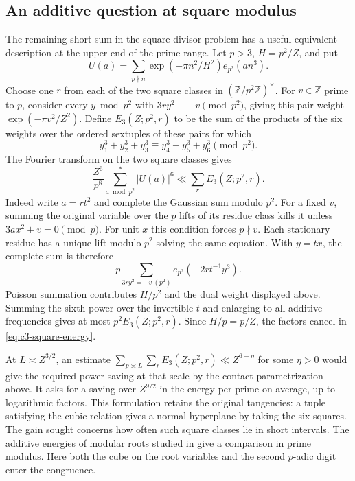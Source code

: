 \documentclass[11pt,letterpaper]{article}
\theoremstyle{definition}
\begin{document}
\subsection{An additive question at square modulus}
\label{c3:dual-energy}
The remaining short sum in the square-divisor problem has a useful
equivalent description at the upper end of the prime range. Let
$p>3$, $H=p^2/Z$, and put
\[
 U(a)=\sum_{p\nmid n}\exp(-\pi n^2/H^2)e_{p^2}(a n^3).
\]
Choose one $r$ from each of the two square classes in
$(\mathbb Z/p^2\mathbb Z)^\times$. For $v\in\mathbb Z$ prime to $p$,
consider every $y\bmod p^2$ with
$3r y^2\equiv-v\pmod{p^2}$, giving this pair weight
$\exp(-\pi v^2/Z^2)$. Define $E_3(Z;p^2,r)$ to be the sum of the
products of the six weights over the ordered sextuples of these pairs
for which
\[
             y_1^3+y_2^3+y_3^3\equiv
                    y_4^3+y_5^3+y_6^3\pmod{p^2}.
\]
The Fourier transform on the two square classes gives
\begin{equation}\label{eq:c3-square-energy}
 \frac{Z^6}{p^8}\sum_{a\bmod p^2}^{*}|U(a)|^6
             \ll\sum_r E_3(Z;p^2,r).
\end{equation}
Indeed write $a=rt^2$ and complete the Gaussian sum modulo $p^2$.
For a fixed $v$, summing the original variable over the $p$ lifts of
its residue class kills it unless $3ax^2+v=0\pmod p$. For unit
$x$ this condition forces $p\nmid v$. Each stationary residue has
a unique lift modulo $p^2$ solving the same equation. With $y=tx$,
the complete sum is therefore
\[
             p\sum_{3ry^2=-v\ (p^2)}
                    e_{p^2}(-2rt^{-1}y^3).
\]
Poisson summation contributes $H/p^2$ and the dual weight displayed
above. Summing the sixth power over the invertible $t$ and enlarging
to all additive frequencies gives at most $p^2 E_3(Z;p^2,r)$.
Since $H/p=p/Z$, the factors cancel in \eqref{eq:c3-square-energy}.

At $L\asymp Z^{3/2}$, an estimate
$\sum_{p\asymp L}\sum_r E_3(Z;p^2,r)\ll Z^{6-\eta}$ for some
$\eta>0$ would give the required power saving at that scale by the
contact parametrization above. It asks for a saving over $Z^{9/2}$
in the energy per prime on average, up to logarithmic factors.
This formulation retains the original tangencies: a tuple satisfying
the cubic relation gives a normal hyperplane by taking the six
squares. The gain sought concerns how often such square classes lie
in short intervals. The additive energies of modular roots studied
in \cite{c3:roots} give a comparison in prime modulus. Here both
the cube on the root variables and the second $p$-adic digit enter
the congruence.
\end{document}
